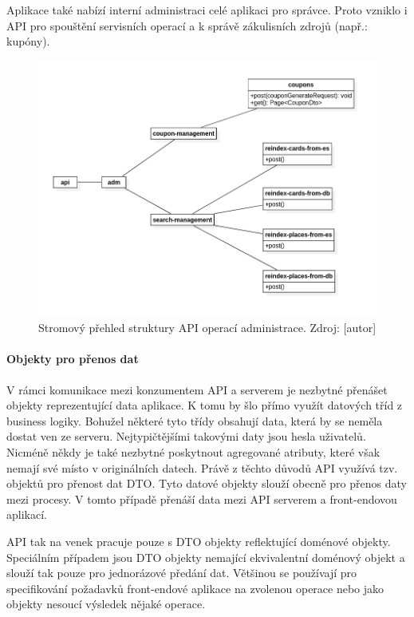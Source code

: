 		Aplikace také nabízí interní administraci celé aplikaci pro správce.
		Proto vzniklo i \ac{API} pro spouštění servisních operací a k správě zákulisních zdrojů (např.: kupóny).

		\begin{figure}[H]
			\centering
			\includegraphics[width=\linewidth]{obrazky/api_model_adm}\hfill
			\caption{Stromový přehled struktury API operací administrace. Zdroj: [autor]}
		\end{figure}

			\paragraph{Objekty pro přenos dat}

			V rámci komunikace mezi konzumentem \ac{API} a serverem je nezbytné přenášet objekty reprezentující data
			aplikace.
			K tomu by šlo přímo využít datových tříd z business logiky.
			Bohužel některé tyto třídy obsahují data, která by se neměla dostat ven ze serveru.
			Nejtypičtějšími takovými daty jsou hesla uživatelů.
			Nicméně někdy je také nezbytné poskytnout agregované atributy, které však nemají své místo v originálních datech.
			Právě z těchto důvodů \ac{API} využívá tzv. objektů pro přenost dat \ac{DTO}.
			Tyto datové objekty slouží obecně pro přenos daty mezi procesy.
			V tomto případě přenáší data mezi \ac{API} serverem a front-endovou aplikací.

			\ac{API} tak na venek pracuje pouze s \ac{DTO} objekty reflektující doménové objekty.
			Speciálním případem jsou \ac{DTO} objekty nemající ekvivalentní doménový objekt a slouží tak pouze pro jednorázové
			předání dat.
			Většinou se používají pro specifikování požadavků front-endové aplikace na zvolenou operace nebo jako
			objekty nesoucí výsledek nějaké operace.

